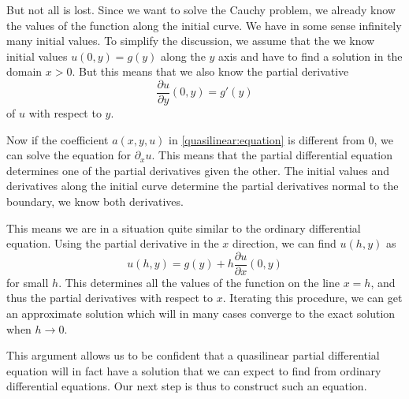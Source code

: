 But not all is lost.
Since we want to solve the Cauchy problem, we already know the 
values of the function along the initial curve.
We have in some sense infinitely many initial values.
To simplify the discussion, we assume that the we know initial values
$u(0,y) = g(y)$ along the $y$ axis and have to find a solution in the domain
$x>0$.
But this means that we also know the partial derivative
\[
\frac{\partial u}{\partial y}(0,y) = g'(y)
\]
of $u$ with respect to $y$.

Now if the coefficient $a(x,y,u)$ in \eqref{quasilinear:equation}
is different from $0$, we can solve the equation for $\partial_x u$.
This means that the partial differential equation determines one of
the partial derivatives given the other.
The initial values and derivatives along the initial curve determine
the partial derivatives normal to the boundary, we know both derivatives.

This means we are in a situation quite similar to the ordinary
differential equation.
Using the partial derivative in the $x$ direction, we can find
$u(h,y)$ as
\[
u(h,y) = g(y) + h\frac{\partial u}{\partial x}(0,y)
\]
for small $h$.
This determines all the values of the function on the line $x=h$,
and thus the partial derivatives with respect to $x$.
Iterating this procedure, we can get an approximate solution
which will in many cases converge to the exact solution when $h\to 0$.

This argument allows us to be confident that a quasilinear partial
differential equation will in fact have a solution that we can expect
to find from ordinary differential equations.
Our next step is thus to construct such an equation.

